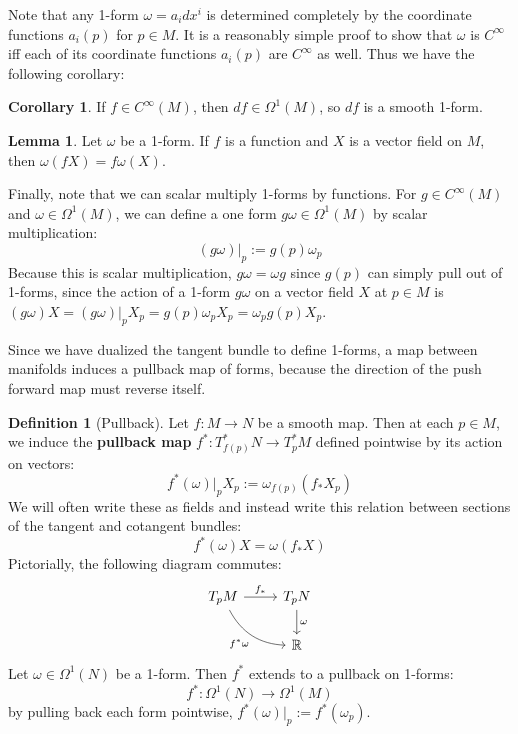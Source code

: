 \documentclass[11pt, oneside]{article}   	%
\theoremstyle{definition}
\newtheorem{definition}{Definition}[section]
\newtheorem{corollary}{Corollary}[theorem]
\newtheorem{lemma}[theorem]{Lemma}
\begin{document}
Note that any 1-form $\omega = a_i dx^i$ is determined completely by the coordinate functions $a_i(p)$ for $p\in M$. It is 
a reasonably simple proof to show that $\omega$ is $C^\infty$ iff each of its coordinate functions $a_i(p)$ are $C^\infty$ as 
well. Thus we have the following corollary:
\begin{corollary}
	If $f\in C^\infty(M)$, then $df\in\Omega^1(M)$, so $df$ is a smooth 1-form. 
\end{corollary}
\begin{lemma}
	Let $\omega$ be a 1-form. If $f$ is a function and $X$ is a vector field on $M$, then $\omega(fX) = f\omega(X)$. 
\end{lemma}
Finally, note that we can scalar multiply 1-forms by functions. For $g\in C^\infty(M)$ and $\omega\in\Omega^1(M)$, we can 
define a one form $g\omega\in\Omega^1(M)$ by scalar multiplication:
\begin{equation}
	(g\omega)|_p := g(p)\omega_p
\end{equation}
Because this is scalar multiplication, $g\omega = \omega g$ since $g(p)$ can simply pull out of 1-forms, since the 
action of a 1-form $g\omega$ on a vector field $X$ at $p\in M$ is $(g\omega) X = (g\omega)|_p X_p = g(p)\omega_p X_p
= \omega_p g(p) X_p$. 

Since we have dualized the tangent bundle to define 1-forms, a map between manifolds induces a pullback map 
of forms, because the direction of the push forward map must reverse itself. 
\begin{definition}[Pullback]
Let $f : M\rightarrow N$ be a smooth map. Then at each $p\in M$, we induce the \textbf{pullback map} $f^* : T_{f(p)}^* N 
\rightarrow T_p^* M$ defined pointwise by its action on vectors:
\begin{equation}
	f^*(\omega)|_p X_p := \omega_{f(p)}(f_* X_p)
\end{equation}
We will often write these as fields and instead write this relation between sections of the tangent and cotangent bundles:
\begin{equation}
	f^*(\omega) X = \omega(f_* X)
\end{equation}
Pictorially, the following diagram commutes:
\begin{equation}\begin{tikzcd}
	T_p M\arrow[r, "f_*"] \arrow[dr, bend right, "f^*\omega"'] & T_p N \arrow[d, "\omega"] \\
	& \mathbb R
\end{tikzcd}\end{equation}
Let $\omega\in\Omega^1(N)$ be a 1-form. Then $f^*$ extends to a pullback on 1-forms:
\begin{equation}
	f^* : \Omega^1(N) \rightarrow\Omega^1(M)
\end{equation}
by pulling back each form pointwise, $f^*(\omega)|_p := f^*(\omega_p)$. 
\end{definition}
\end{document}
